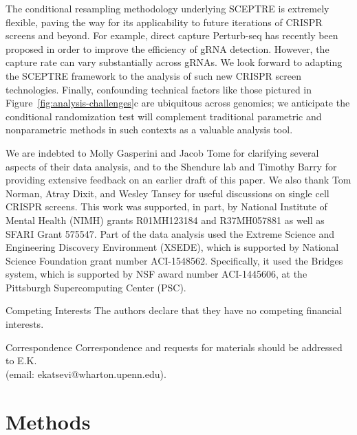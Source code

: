 \documentclass{nature}
\begin{document}
The conditional resampling methodology underlying SCEPTRE is extremely flexible, paving the way for its applicability to future iterations of CRISPR screens and beyond. For example, direct capture Perturb-seq\cite{Replogle2020} has recently been proposed in order to improve the efficiency of gRNA detection. However, the capture rate can vary substantially across gRNAs. We look forward to adapting the SCEPTRE framework to the analysis of such new CRISPR screen technologies. Finally, confounding technical factors like those pictured in Figure~\ref{fig:analysis-challenges}c are ubiquitous across genomics; we anticipate the conditional randomization test will complement traditional parametric and nonparametric methods in such contexts as a valuable analysis tool.



\clearpage

\begin{addendum}
 \item We are indebted to Molly Gasperini and Jacob Tome for clarifying several aspects of their data analysis\cite{Gasperini2019}, and to the Shendure lab and Timothy Barry for providing extensive feedback on an earlier draft of this paper. We also thank Tom Norman, Atray Dixit, and Wesley Tansey for useful discussions on single cell CRISPR screens. This work was supported, in part, by National Institute of Mental Health (NIMH) grants R01MH123184 and R37MH057881 as well as SFARI Grant 575547. Part of the data analysis used the Extreme Science and Engineering Discovery Environment (XSEDE)\cite{XSEDE}, which is supported by National Science Foundation grant number ACI-1548562. Specifically, it used the Bridges system\cite{Bridges}, which is supported by NSF award number ACI-1445606, at the Pittsburgh Supercomputing Center (PSC). \item[Competing Interests] The authors declare that they have no
competing financial interests.
 \item[Correspondence] Correspondence and requests for materials
should be addressed to E.K. \\ (email: ekatsevi@wharton.upenn.edu).
\end{addendum}





\section*{Methods}
\end{document}
